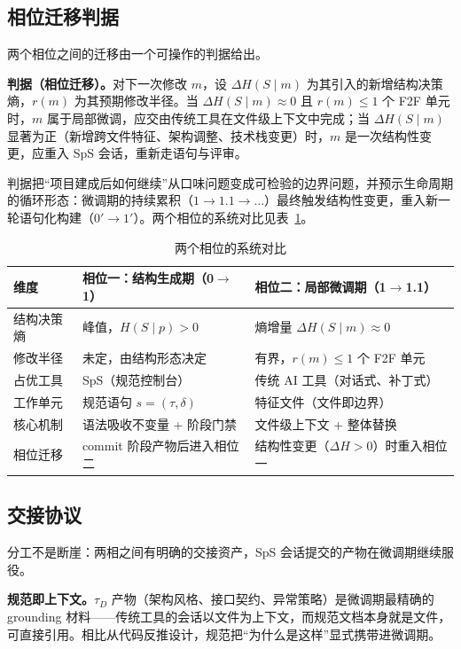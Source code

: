 \documentclass[11pt,a4paper]{ctexart}
\begin{document}
\subsection{相位迁移判据}
两个相位之间的迁移由一个可操作的判据给出。

\textbf{判据（相位迁移）。}对下一次修改 $m$，设 $\Delta H(S\mid m)$ 为其引入的新增结构决策熵，$r(m)$ 为其预期修改半径。当 $\Delta H(S\mid m)\approx 0$ 且 $r(m)\le 1$ 个 F2F 单元时，$m$ 属于局部微调，应交由传统工具在文件级上下文中完成；当 $\Delta H(S\mid m)$ 显著为正（新增跨文件特征、架构调整、技术栈变更）时，$m$ 是一次结构性变更，应重入 SpS 会话，重新走语句与评审。

判据把“项目建成后如何继续”从口味问题变成可检验的边界问题，并预示生命周期的循环形态：微调期的持续累积（$1\to1.1\to\ldots$）最终触发结构性变更，重入新一轮语句化构建（$0'\to1'$）。两个相位的系统对比见表~\ref{tab:phases}。

\begin{table}[htbp]
\centering
\caption{两个相位的系统对比}
\label{tab:phases}
\small
\begin{tabular}{|l|l|l|}
\hline
\textbf{维度} & \textbf{相位一：结构生成期（0$\to$1）} & \textbf{相位二：局部微调期（1$\to$1.1）} \\
\hline
结构决策熵 & 峰值，$H(S\mid p)>0$ & 熵增量 $\Delta H(S\mid m)\approx 0$ \\
\hline
修改半径 & 未定，由结构形态决定 & 有界，$r(m)\le 1$ 个 F2F 单元 \\
\hline
占优工具 & SpS（规范控制台） & 传统 AI 工具（对话式、补丁式） \\
\hline
工作单元 & 规范语句 $s=(\tau,\delta)$ & 特征文件（文件即边界） \\
\hline
核心机制 & 语法吸收不变量 + 阶段门禁 & 文件级上下文 + 整体替换 \\
\hline
相位迁移 & commit 阶段产物后进入相位二 & 结构性变更（$\Delta H>0$）时重入相位一 \\
\hline
\end{tabular}
\end{table}

\subsection{交接协议}
分工不是断崖：两相之间有明确的交接资产，SpS 会话提交的产物在微调期继续服役。

\textbf{规范即上下文。}$\tau_D$ 产物（架构风格、接口契约、异常策略）是微调期最精确的 grounding 材料——传统工具的会话以文件为上下文，而规范文档本身就是文件，可直接引用。相比从代码反推设计，规范把“为什么是这样”显式携带进微调期。
\end{document}
